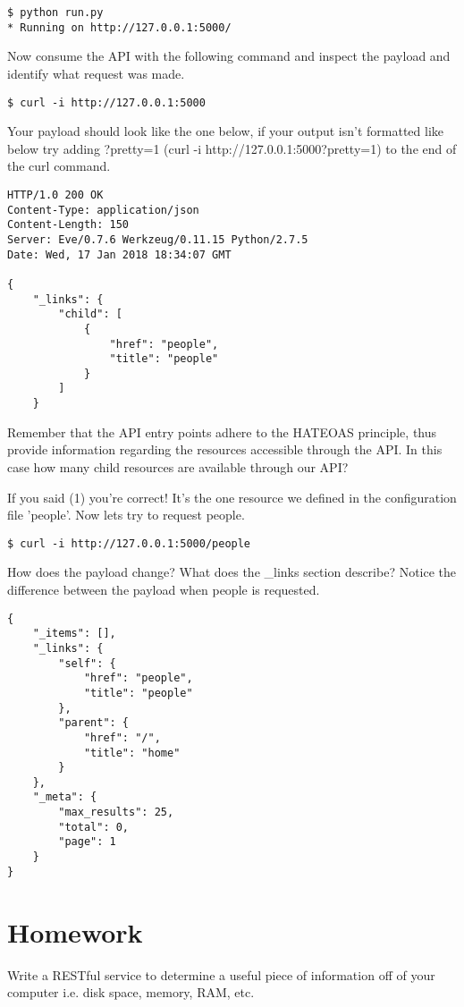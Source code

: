 \documentclass{article}
\begin{document}
\begin{verbatim}
$ python run.py
* Running on http://127.0.0.1:5000/
\end{verbatim}

Now consume the API with the following command and inspect the payload
and identify what request was made.

\begin{verbatim}
$ curl -i http://127.0.0.1:5000
\end{verbatim}

Your payload should look like the one below, if your output isn't
formatted like below try adding ?pretty=1 (curl -i
http://127.0.0.1:5000?pretty=1) to the end of the curl command.
\begin{verbatim}
HTTP/1.0 200 OK
Content-Type: application/json
Content-Length: 150
Server: Eve/0.7.6 Werkzeug/0.11.15 Python/2.7.5
Date: Wed, 17 Jan 2018 18:34:07 GMT

{
    "_links": {
        "child": [
            {
                "href": "people",
                "title": "people"
            }
        ]
    }
\end{verbatim}

Remember that the API entry points adhere to the HATEOAS principle,
thus provide information regarding the resources accessible through
the API. In this case how many child resources are available through
our API?

\vspace{5mm}

If you said (1) you're correct! It's the one resource we defined in
the configuration file 'people'. Now lets try to request people.

\begin{verbatim}
$ curl -i http://127.0.0.1:5000/people
\end{verbatim}

How does the payload change? What does the \_links section describe?
Notice the difference between the payload when people is requested.

\begin{verbatim}
{
    "_items": [],
    "_links": {
        "self": {
            "href": "people",
            "title": "people"
        },
        "parent": {
            "href": "/",
            "title": "home"
        }
    },
    "_meta": {
        "max_results": 25,
        "total": 0,
        "page": 1
    }
}
\end{verbatim}


\section{Homework}
Write a RESTful service to determine a useful piece of information off
of your computer i.e. disk space, memory, RAM, etc.
\end{document}
